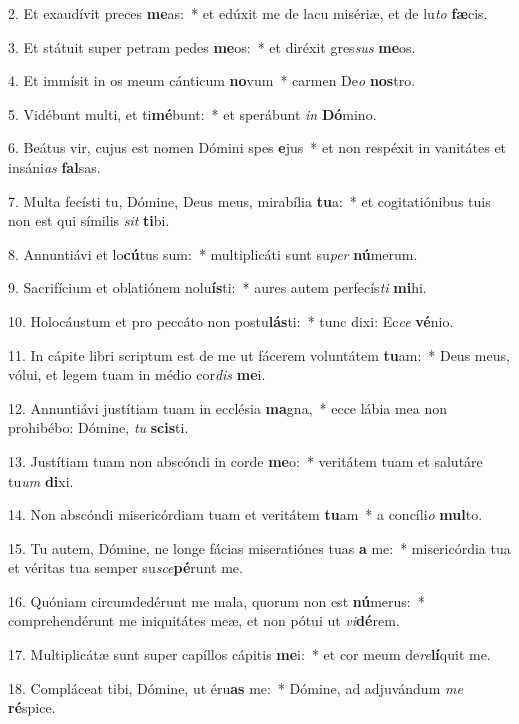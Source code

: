 2. Et exaudívit preces \textbf{me}as:~*  et edúxit me de lacu misériæ, et de lu\textit{to} \textbf{fæ}cis.\

3. Et státuit super petram pedes \textbf{me}os:~*  et diréxit gres\textit{sus} \textbf{me}os.\

4. Et immísit in os meum cánticum \textbf{no}vum~*  carmen De\textit{o} \textbf{nos}tro.\

5. Vidébunt multi, et ti\textbf{mé}bunt:~*  et sperábunt \textit{in} \textbf{Dó}mino.\

6. Beátus vir, cujus est nomen Dómini spes \textbf{e}jus~*  et non respéxit in vanitátes et insáni\textit{as} \textbf{fal}sas.\

7. Multa fecísti tu, Dómine, Deus meus, mirabília \textbf{tu}a:~*  et cogitatiónibus tuis non est qui símilis \textit{sit} \textbf{ti}bi.\

8. Annuntiávi et lo\textbf{cú}tus sum:~*  multiplicáti sunt su\textit{per} \textbf{nú}merum.\

9. Sacrifícium et oblatiónem nolu\textbf{ís}ti:~*  aures autem perfecís\textit{ti} \textbf{mi}hi.\

10. Holocáustum et pro peccáto non postu\textbf{lás}ti:~*  tunc dixi: Ec\textit{ce} \textbf{vé}nio.\

11. In cápite libri scriptum est de me ut fácerem voluntátem \textbf{tu}am:~*  Deus meus, vólui, et legem tuam in médio cor\textit{dis} \textbf{me}i.\

12. Annuntiávi justítiam tuam in ecclésia \textbf{ma}gna,~*  ecce lábia mea non prohibébo: Dómine, \textit{tu} \textbf{scis}ti.\

13. Justítiam tuam non abscóndi in corde \textbf{me}o:~*  veritátem tuam et salutáre tu\textit{um} \textbf{di}xi.\

14. Non abscóndi misericórdiam tuam et veritátem \textbf{tu}am~*  a concíli\textit{o} \textbf{mul}to.\

15. Tu autem, Dómine, ne longe fácias miseratiónes tuas \textbf{a} me:~*  misericórdia tua et véritas tua semper su\textit{sce}\textbf{pé}runt me.\

16. Quóniam circumdedérunt me mala, quorum non est \textbf{nú}merus:~*  comprehendérunt me iniquitátes meæ, et non pótui ut \textit{vi}\textbf{dé}rem.\

17. Multiplicátæ sunt super capíllos cápitis \textbf{me}i:~*  et cor meum de\textit{re}\textbf{lí}quit me.\

18. Compláceat tibi, Dómine, ut éru\textbf{as} me:~*  Dómine, ad adjuvándum \textit{me} \textbf{ré}spice.\

